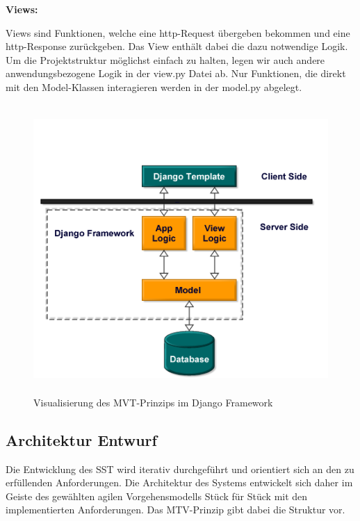 \newpage

\noindent \textbf{Views:}\par
\vspace{0,5cm}
\noindent Views sind Funktionen, welche eine http-Request übergeben bekommen und eine http-Response zurückgeben. Das View enthält dabei die dazu notwendige Logik. Um die Projektstruktur möglichst einfach zu halten, legen wir auch andere anwendungsbezogene Logik in der view.py Datei ab. Nur Funktionen, die direkt mit den Model-Klassen interagieren werden in der model.py abgelegt.\par
\vspace{1cm}
\begin{figure}[htp]
    \centering
    \includegraphics[width=12cm , height=11cm]{Kapitel/Bilder/MVT-Erweitert-Diesmalwirklich.PNG}
    \caption{Visualisierung des MVT-Prinzips im Django Framework}
    \label{fig:MVT_Erweitert}
\end{figure}
\newpage
\subsection{Architektur Entwurf}
Die Entwicklung des SST wird iterativ durchgeführt und orientiert sich an den zu erfüllenden Anforderungen. Die Architektur des Systems entwickelt sich daher im Geiste des gewählten agilen Vorgehensmodells Stück für Stück mit den implementierten Anforderungen. Das MTV-Prinzip gibt dabei die Struktur vor. 



